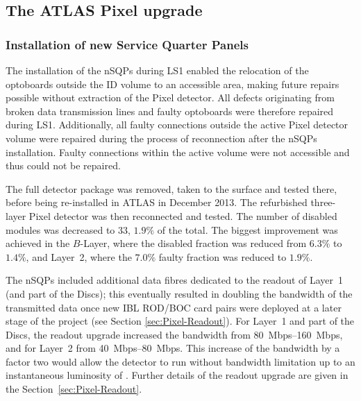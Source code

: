 \documentclass[cernpreprint, atlasdraft=false, UKenglish,british,orcidlogo, texmf, orcidlogo]{atlasdoc}
\begin{document}

 

\subsection{The ATLAS Pixel upgrade} 
\label{sec:Pixel}
 
\subsubsection{Installation of new Service Quarter Panels}
 
The installation of the \glspl{nSQP} during \gls{LS1} enabled the relocation of the optoboards outside the \gls{ID} volume to an accessible area, making future repairs possible without extraction of the Pixel detector. All defects originating from broken data transmission lines and faulty optoboards were therefore repaired during \gls{LS1}.
Additionally, all faulty connections outside the active Pixel detector volume were repaired during the process of reconnection after the \glspl{nSQP} installation. Faulty connections within the active volume were not accessible and thus could not be repaired.
 
The full detector package was removed, taken to the surface and tested there, before being re-installed in ATLAS in December 2013.
The refurbished three-layer Pixel detector was then reconnected and tested.
The number of disabled modules was decreased to 33, 
$1.9\%$ of the total. The biggest improvement was achieved in the $B$-Layer, where the disabled fraction was reduced from $6.3\%$ to $1.4\%$, and Layer~2, where the $7.0\%$ faulty fraction was reduced to $1.9\%$.
 
The \glspl{nSQP} included additional data fibres dedicated to the readout of Layer~1 (and part of the Discs); this eventually resulted in doubling the bandwidth of the transmitted data once new \gls{IBL} \gls{ROD}/\gls{BOC} card pairs were deployed at a later stage of the project (see Section \ref{sec:Pixel-Readout}).
For Layer~1 and part of the Discs, the readout upgrade increased the bandwidth from \SIrange{80}{160}{Mbps}, and for Layer~2 from \SIrange{40}{80}{Mbps}.
This increase of the bandwidth by a factor two would allow the detector to run without bandwidth limitation up to an instantaneous luminosity of \lumirunthreedesign. Further details of the readout upgrade are given in the Section~\ref{sec:Pixel-Readout}.
 
\end{document}
